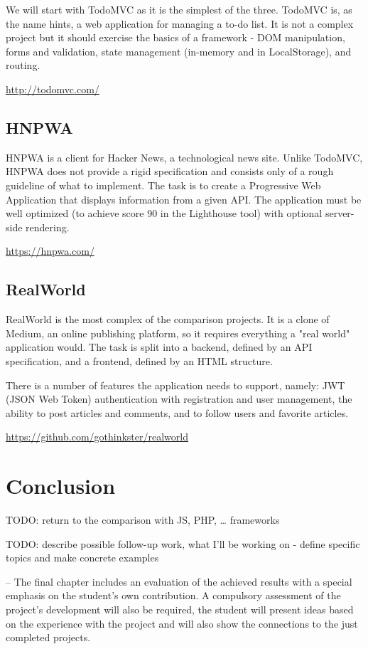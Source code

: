 \documentclass[english,odsaz]{fitthesis}
\begin{document}
We will start with TodoMVC as it is the simplest of the three. TodoMVC is, as
the name hints, a web application for managing a to-do list. It is not a complex
project but it should exercise the basics of a framework - DOM manipulation,
forms and validation, state management (in-memory and in LocalStorage), and
routing.

\url{http://todomvc.com/}

\section{HNPWA}
\label{sec:orgdd8d4e9}
HNPWA is a client for Hacker News, a technological news site. Unlike TodoMVC,
HNPWA does not provide a rigid specification and consists only of a rough
guideline of what to implement. The task is to create a Progressive Web
Application that displays information from a given API. The application must be
well optimized (to achieve score 90 in the Lighthouse tool) with optional
server-side rendering.

\url{https://hnpwa.com/}

\section{RealWorld}
\label{sec:org3c092be}
RealWorld is the most complex of the comparison projects. It is a clone of
Medium, an online publishing platform, so it requires everything a "real world"
application would. The task is split into a backend, defined by an API
specification, and a frontend, defined by an HTML structure.

There is a number of features the application needs to support, namely: JWT
(JSON Web Token) authentication with registration and user management, the
ability to post articles and comments, and to follow users and favorite articles.

\url{https://github.com/gothinkster/realworld}

\chapter{Conclusion}
\label{sec:orgd20095a}
TODO: return to the comparison with JS, PHP, \ldots{} frameworks

TODO: describe possible follow-up work, what I'll be working on - define
  specific topics and make concrete examples

-- The final chapter includes an evaluation of the achieved results with a special
emphasis on the student's own contribution. A compulsory assessment of the
project's development will also be required, the student will present ideas
based on the experience with the project and will also show the connections to
the just completed projects. \cite{Pravidla}
\end{document}

